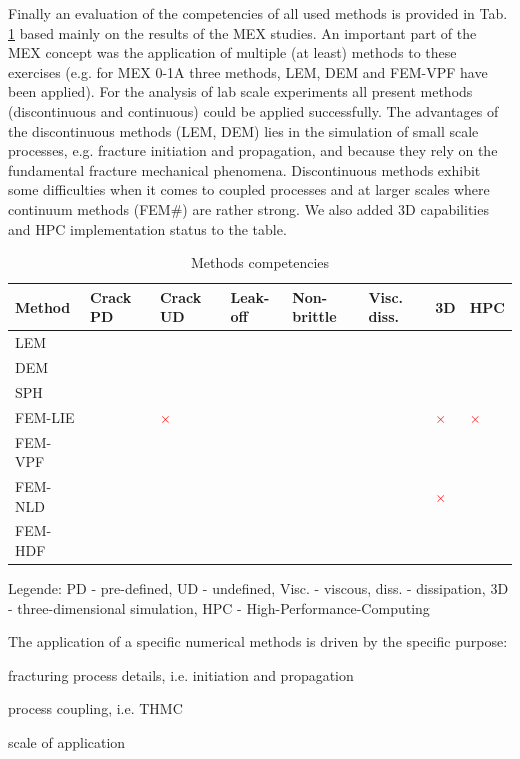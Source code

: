 Finally an evaluation of the competencies of all used methods is provided in Tab. \ref{tab:competencies} based mainly on the results of the MEX studies.
An important part of the MEX concept was the application of multiple (at least) methods to these exercises (e.g. for MEX 0-1A three methods, LEM, DEM and FEM-VPF have been applied). For the analysis of lab scale experiments all present methods (discontinuous and continuous) could be applied successfully. The advantages of the discontinuous methods (LEM, DEM) lies in the simulation of small scale processes, e.g. fracture initiation and propagation, and because they rely on the fundamental fracture mechanical phenomena. Discontinuous methods exhibit some difficulties when it comes to coupled processes and at larger scales where continuum methods (FEM\#) are rather strong. We also added 3D capabilities and HPC implementation status to the table.

\newcommand{\done}{\textcolor{green}{\checkmark}}
\newcommand{\perh}{\textcolor{orange}{\checkmark}}
\newcommand{\none}{\textcolor{red}{$\times$}}
\begin{table}[h!]
\centering
\caption{Methods competencies}
\label{tab:competencies}
\footnotesize
\begin{tabular}{llllllll}
\hline
Method  & Crack PD & Crack UD & Leak-off & Non-brittle & Visc. diss. & 3D & HPC \\
\hline
LEM     & \done & \done & \perh & \done & \done & \perh & \perh \\
DEM     & \done & \done & \perh & \done & \done & \perh & \done \\
SPH     & \done & \perh & \done & \perh & \done & \done & \done \\
FEM-LIE & \done & \none & \done & \done & \perh & \none & \none \\
FEM-VPF & \done & \done & \done & \done & \perh & \done & \done \\
FEM-NLD & \done & \done & \perh & \done & \perh & \none & \done \\
FEM-HDF &  &  &  &  &  &  & \\
\hline
\end{tabular}
\end{table}
\vspace{-5mm}
\tiny Legende: PD - pre-defined, UD - undefined, Visc. - viscous, diss. - dissipation, 3D - three-dimensional simulation, HPC - High-Performance-Computing 
\normalsize

\bigskip
The application of a specific numerical methods is driven by the specific purpose:
\begin{list}{-}{\leftmargin=1em \itemindent=0em \itemsep=0em}
\item fracturing process details, i.e. initiation and propagation
\item process coupling, i.e. THMC
\item scale of application
\end{list}

